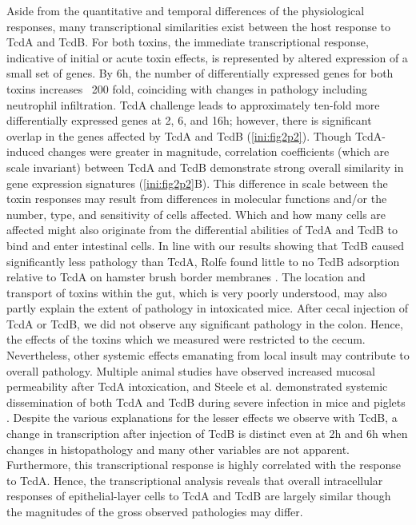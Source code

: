 Aside from the quantitative and temporal differences of the 
physiological responses, many transcriptional similarities exist 
between the host response to TcdA and TcdB. For both toxins, the 
immediate transcriptional response, indicative of initial or 
acute toxin effects, is represented by altered expression of a 
small set of genes. By 6h, the number of differentially expressed 
genes for both toxins increases ~200 fold, coinciding with 
changes in pathology including neutrophil infiltration. TcdA 
challenge leads to approximately ten-fold more differentially 
expressed genes at 2, 6, and 16h; however, there is significant 
overlap in the genes affected by TcdA and TcdB (\autoref{ini:fig2p2}). 
Though TcdA-induced changes were greater in magnitude, correlation 
coefficients (which are scale invariant) between TcdA and TcdB 
demonstrate strong overall similarity in gene expression 
signatures (\autoref{ini:fig2p2}B). This difference in scale 
between the toxin responses may result from differences in molecular 
functions and/or the number, type, and sensitivity of cells affected. 
Which and how many cells are affected might also originate from the 
differential abilities of TcdA and TcdB to bind and enter 
intestinal cells. In line with our results showing that TcdB caused 
significantly less pathology than TcdA, Rolfe found little to no 
TcdB adsorption relative to TcdA on hamster brush border membranes 
\cite{Rolfe:1991vx}. The location and transport of toxins within 
the gut, which is very poorly understood, may also partly explain 
the extent of pathology in intoxicated mice. After cecal injection 
of TcdA or TcdB, we did not observe any significant pathology in 
the colon. Hence, the effects of the toxins which we measured were 
restricted to the cecum. Nevertheless, other systemic effects 
emanating from local insult may contribute to overall pathology. 
Multiple animal studies have observed increased mucosal permeability 
after TcdA intoxication, and Steele et al. demonstrated systemic 
dissemination of both TcdA and TcdB during severe infection in mice 
and piglets \cite{Steele:2012ft}. Despite the various explanations 
for the lesser effects we observe with TcdB, a change in 
transcription after injection of TcdB is distinct even at 2h and 
6h when changes in histopathology and many other variables are 
not apparent. Furthermore, this transcriptional response is 
highly correlated with the response to TcdA. Hence, the transcriptional 
analysis reveals that overall intracellular responses of 
epithelial-layer cells to TcdA and TcdB are largely similar though 
the magnitudes of the gross observed pathologies may differ.
 
